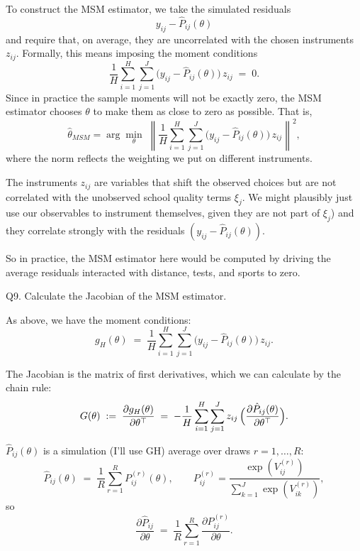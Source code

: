\documentclass{article}
\begin{document}
\vspace{5mm}

To construct the MSM estimator, we take the simulated residuals 
\[
y_{ij} - \hat P_{ij}(\theta)
\]
and require that, on average, they are uncorrelated with the chosen instruments $z_{ij}$.  
Formally, this means imposing the moment conditions
\[
\frac{1}{H}\sum_{i=1}^H \sum_{j=1}^J 
\bigl(y_{ij} - \hat P_{ij}(\theta)\bigr)\, z_{ij} \;=\; 0.
\]
Since in practice the sample moments will not be exactly zero, the MSM estimator chooses $\theta$ to make them as close to zero as possible.  
That is,
\[
\hat{\theta}_{MSM}
= \arg\min_{\theta}\;
\left\|
\frac{1}{H}\sum_{i=1}^H \sum_{j=1}^J 
\bigl(y_{ij} - \hat P_{ij}(\theta)\bigr)\, z_{ij}
\right\|^2,
\]
where the norm reflects the weighting we put on different instruments.


\medskip
\noindent
The instruments $z_{ij}$ are variables that shift the observed choices but are not correlated with the unobserved school quality terms $\xi_j$.  
We might plausibly just use our observables to instrument themselves, given they are not part of $\xi_j$) and they correlate strongly with the residuals $(y_{ij}-\hat P_{ij}(\theta))$.

\vspace{5mm}

So in practice, the MSM estimator here would be computed by driving the average residuals interacted with distance, tests, and sports to zero.  


\begin{tcolorbox}
Q9. Calculate the Jacobian of the MSM estimator.
\end{tcolorbox}

As above, we have the moment conditions:
\[
g_H(\theta) \;=\; \frac{1}{H}\sum_{i=1}^H \sum_{j=1}^J 
\bigl(y_{ij}-\hat P_{ij}(\theta)\bigr)\, z_{ij}.
\]

The Jacobian is the matrix of first derivatives, which we can calculate by the chain rule:
\[
G(\theta)\;:=\;\frac{\partial g_H(\theta)}{\partial \theta^\top}
\;=\;-\frac{1}{H}\sum_{i=1}^H\sum_{j=1}^J z_{ij}\,\Bigl(\frac{\partial \hat P_{ij}(\theta)}{\partial \theta^\top}\Bigr).
\]

$\hat P_{ij}(\theta)$ is a simulation (I'll use GH) average over draws $r=1,\ldots,R$:
\[
\hat P_{ij}(\theta)\;=\;\frac{1}{R}\sum_{r=1}^R P^{(r)}_{ij}(\theta),\qquad
P^{(r)}_{ij}=\frac{\exp(V^{(r)}_{ij})}{\sum_{k=1}^J \exp(V^{(r)}_{ik})},
\]
so
\[
\frac{\partial \hat P_{ij}}{\partial \theta}
\;=\;\frac{1}{R}\sum_{r=1}^R \frac{\partial P^{(r)}_{ij}}{\partial \theta}.
\]
\end{document}
